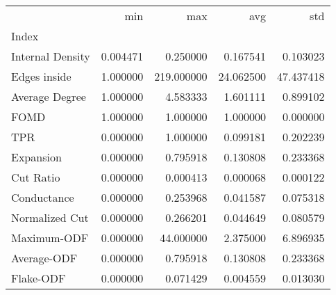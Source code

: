 \begin{tabular}{lrrrr}
\toprule
{} &       min &         max &        avg &        std \\
Index            &           &             &            &            \\
\midrule
Internal Density &  0.004471 &    0.250000 &   0.167541 &   0.103023 \\
Edges inside     &  1.000000 &  219.000000 &  24.062500 &  47.437418 \\
Average Degree   &  1.000000 &    4.583333 &   1.601111 &   0.899102 \\
FOMD             &  1.000000 &    1.000000 &   1.000000 &   0.000000 \\
TPR              &  0.000000 &    1.000000 &   0.099181 &   0.202239 \\
Expansion        &  0.000000 &    0.795918 &   0.130808 &   0.233368 \\
Cut Ratio        &  0.000000 &    0.000413 &   0.000068 &   0.000122 \\
Conductance      &  0.000000 &    0.253968 &   0.041587 &   0.075318 \\
Normalized Cut   &  0.000000 &    0.266201 &   0.044649 &   0.080579 \\
Maximum-ODF      &  0.000000 &   44.000000 &   2.375000 &   6.896935 \\
Average-ODF      &  0.000000 &    0.795918 &   0.130808 &   0.233368 \\
Flake-ODF        &  0.000000 &    0.071429 &   0.004559 &   0.013030 \\
\bottomrule
\end{tabular}
